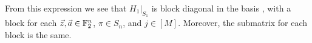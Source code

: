 \documentclass[../thesis-main/thesis-main]{subfiles}
\begin{document}
%
%
%

From this expression we see that $H_{1}|_{S_1}$ is block diagonal in the basis , with a block for each $\vec{z},\vec{a}\in\mathbb{F}_2^{n}$, $\pi \in S_n$, and $j\in[M]$. Moreover, the submatrix for each block is the same. %
\end{document}
